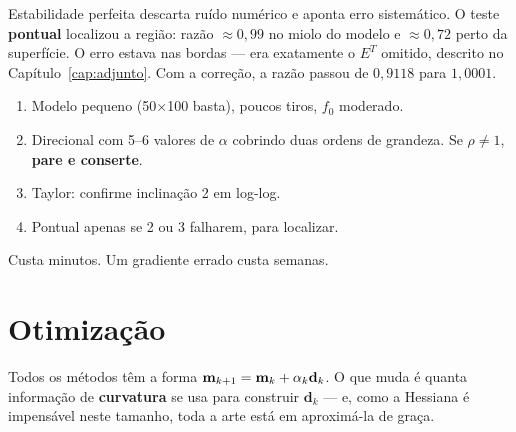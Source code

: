 \documentclass[11pt,a4paper,oneside]{report}
\begin{document}
Estabilidade perfeita descarta ru\'ido num\'erico e aponta erro
sistem\'atico. O teste \textbf{pontual} localizou a regi\~ao: raz\~ao
$\approx 0{,}99$ no miolo do modelo e $\approx 0{,}72$ perto da superf\'icie.
O erro estava nas bordas --- era exatamente o $E^{T}$ omitido, descrito no
Cap\'itulo~\ref{cap:adjunto}. Com a corre\c{c}\~ao, a raz\~ao passou de
$0{,}9118$ para $1{,}0001$.

\begin{pratica}
\begin{enumerate}[leftmargin=*, itemsep=1pt]
\item Modelo pequeno (50$\times$100 basta), poucos tiros, $f_0$ moderado.
\item Direcional com 5--6 valores de $\alpha$ cobrindo duas ordens de
grandeza. Se $\rho \ne 1$, \textbf{pare e conserte}.
\item Taylor: confirme inclina\c{c}\~ao 2 em log-log.
\item Pontual apenas se 2 ou 3 falharem, para localizar.
\end{enumerate}
Custa minutos. Um gradiente errado custa semanas.
\end{pratica}

\chapter{Otimiza\c{c}\~ao}
\label{cap:otimizacao}

\begin{ideia}
Todos os m\'etodos t\^em a forma $\mathbf{m}_{k+1} = \mathbf{m}_k + \alpha_k\mathbf{d}_k$.
O que muda \'e quanta informa\c{c}\~ao de \textbf{curvatura} se usa para
construir $\mathbf{d}_k$ --- e, como a Hessiana \'e impens\'avel neste
tamanho, toda a arte est\'a em aproxim\'a-la de gra\c{c}a.
\end{ideia}
\end{document}
